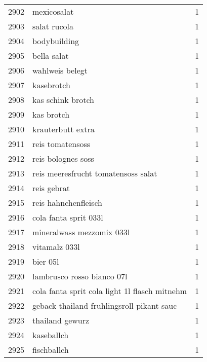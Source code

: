 \begin{tabular}{llr}
2902 &                                        mexicosalat &      1 \\
2903 &                                       salat rucola &      1 \\
2904 &                                       bodybuilding &      1 \\
2905 &                                        bella salat &      1 \\
2906 &                                    wahlweis belegt &      1 \\
2907 &                                         kasebrotch &      1 \\
2908 &                                  kas schink brotch &      1 \\
2909 &                                         kas brotch &      1 \\
2910 &                                  krauterbutt extra &      1 \\
2911 &                                   reis tomatensoss &      1 \\
2912 &                                 reis bolognes soss &      1 \\
2913 &                reis meeresfrucht tomatensoss salat &      1 \\
2914 &                                        reis gebrat &      1 \\
2915 &                               reis hahnchenfleisch &      1 \\
2916 &                              cola fanta sprit 033l &      1 \\
2917 &                          mineralwass mezzomix 033l &      1 \\
2918 &                                      vitamalz 033l &      1 \\
2919 &                                           bier 05l &      1 \\
2920 &                         lambrusco rosso bianco 07l &      1 \\
2921 &      cola fanta sprit cola light 1l flasch mitnehm &      1 \\
2922 &          geback thailand fruhlingsroll pikant sauc &      1 \\
2923 &                                    thailand gewurz &      1 \\
2924 &                                         kaseballch &      1 \\
2925 &                                        fischballch &      1 \\

\end{tabular}
